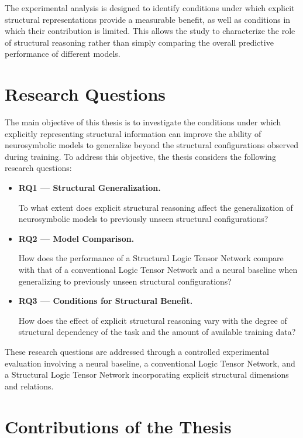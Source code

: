 \noindent
The experimental analysis is designed to identify conditions under which explicit structural representations provide a measurable benefit, as well as conditions in which their contribution is limited. This allows the study to characterize the role of structural reasoning rather than simply comparing the overall predictive performance of different models.
\section{Research Questions}

\noindent
The main objective of this thesis is to investigate the conditions under which explicitly representing structural information can improve the ability of neurosymbolic models to generalize beyond the structural configurations observed during training. To address this objective, the thesis considers the following research questions:

\begin{itemize}

\item \textbf{RQ1 --- Structural Generalization.}

To what extent does explicit structural reasoning affect the generalization of neurosymbolic models to previously unseen structural configurations?

\item \textbf{RQ2 --- Model Comparison.}

How does the performance of a Structural Logic Tensor Network compare with that of a conventional Logic Tensor Network and a neural baseline when generalizing to previously unseen structural configurations?

\item \textbf{RQ3 --- Conditions for Structural Benefit.}

How does the effect of explicit structural reasoning vary with the degree of structural dependency of the task and the amount of available training data?

\end{itemize}

\noindent
These research questions are addressed through a controlled experimental evaluation involving a neural baseline, a conventional Logic Tensor Network, and a Structural Logic Tensor Network incorporating explicit structural dimensions and relations.

\section{Contributions of the Thesis}

